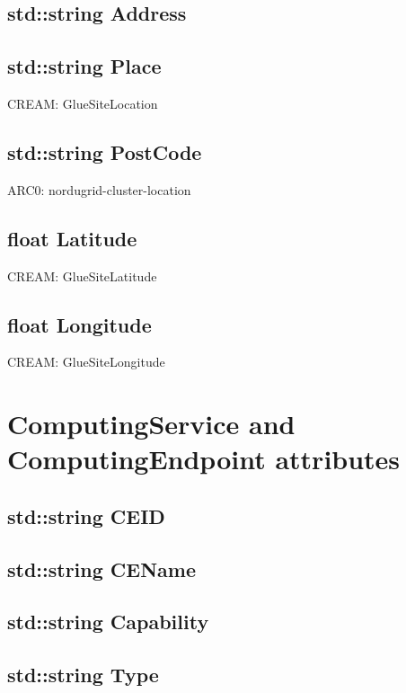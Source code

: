 \documentclass{book}
\begin{document}
\subsection*{std::string Address}

\subsection*{std::string Place}

CREAM: GlueSiteLocation

\subsection*{std::string PostCode}

ARC0: nordugrid-cluster-location

\subsection*{float Latitude}

CREAM: GlueSiteLatitude

\subsection*{float Longitude}

CREAM: GlueSiteLongitude

\section{ComputingService and ComputingEndpoint attributes}

\subsection*{std::string CEID}

\subsection*{std::string CEName}

\subsection*{std::string Capability}

\subsection*{std::string Type}
\end{document}
